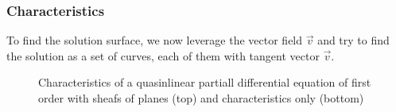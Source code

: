 \subsubsection{Characteristics}
To find the solution surface, we now leverage the vector field $\vec{v}$
and try to find the solution as a set of curves, each of them with
tangent vector $\vec{v}$.
\begin{figure}
\centering
{}
\caption{Characteristics of a quasinlinear partiall differential equation
of first order with sheafs of planes (top) and characteristics only (bottom)
\label{geometrie:charekeristiken-mit-buescheln}}
\end{figure}

